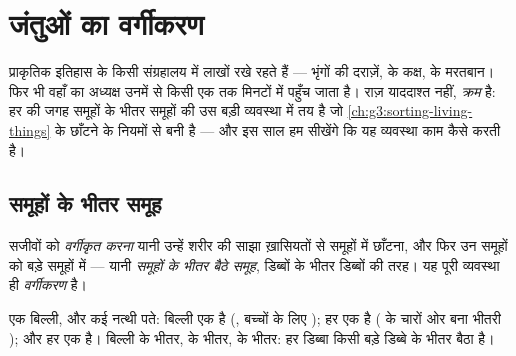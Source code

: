 \chapter{जंतुओं का वर्गीकरण}\label{ch:g4:classifying-animals}

प्राकृतिक इतिहास के किसी संग्रहालय में लाखों  रखे रहते हैं ---
भृंगों की दराज़ें,  के कक्ष,  के मरतबान। फिर भी वहाँ का
अध्यक्ष उनमें से किसी एक तक मिनटों में पहुँच जाता है। राज़ याददाश्त
नहीं, \emph{क्रम} है: हर  की जगह समूहों के भीतर समूहों की उस बड़ी
व्यवस्था में तय है जो \cref{ch:g3:sorting-living-things} के छाँटने के
नियमों से बनी है --- और इस साल हम सीखेंगे कि यह व्यवस्था काम कैसे करती
है।

\section{समूहों के भीतर समूह}

\begin{definition}[वर्गीकरण]\label{def:g4:classifying-animals:classification}
सजीवों को \emph{वर्गीकृत करना} यानी उन्हें शरीर की
साझा ख़ासियतों से समूहों में छाँटना, और फिर उन समूहों को बड़े समूहों
में --- यानी \emph{समूहों के भीतर बैठे
समूह}, डिब्बों के भीतर डिब्बों की तरह। यह पूरी
व्यवस्था ही \emph{वर्गीकरण} है।
\end{definition}

\begin{example}[बिल्ली के पते]\label{ex:g4:classifying-animals:cat}
एक बिल्ली, और कई नत्थी पते: बिल्ली एक \emph{} है (, बच्चों
के लिए ); हर  एक \emph{} है ( के चारों ओर बना
भीतरी ); और हर  एक \emph{} है। बिल्ली  के
भीतर,   के भीतर,   के भीतर: हर डिब्बा
किसी बड़े डिब्बे के भीतर बैठा है।
\end{example}

